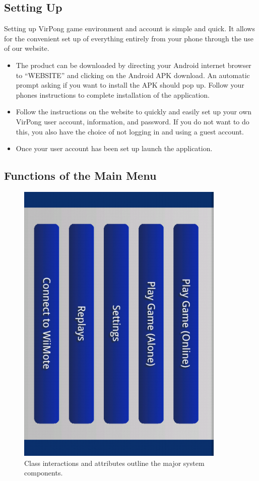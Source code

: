 \documentclass[12pt]{article}
\begin{document}
\subsection{Setting Up}
Setting up VirPong game environment and account is simple and quick. It allows for the convenient set up of everything entirely from your phone through the use of our website.
\begin{itemize}
\item The product can be downloaded by directing your Android internet browser to “WEBSITE” and clicking on the Android APK download. An automatic prompt asking if you want to install the APK should pop up. Follow your phones instructions to complete installation of the application.
\item Follow the instructions on the website to quickly and easily set up your own VirPong user account, information, and password. If you do not want to do this, you also have the choice of not logging in and using a guest account.
\item Once your user account has been set up launch the application.
\end{itemize}
\subsection{Functions of the Main Menu}
\begin{figure}
\begin{center}
\includegraphics[scale=.7]{ homeScreen.png}
\caption{\label{domainModel}Class interactions and attributes outline the major system components.}
\end{center}
\end{figure}
\end{document}
